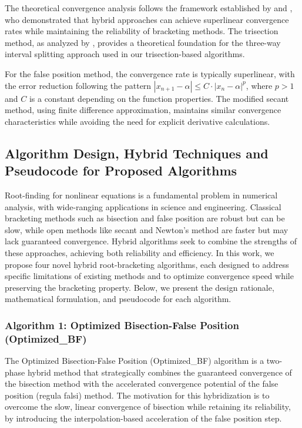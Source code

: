 \documentclass[amsmath, amssymb, aps]{revtex4-2}
\begin{document}
The theoretical convergence analysis follows the framework established by \cite{sabharwal2019blended} and \cite{badr2022novel}, who demonstrated that hybrid approaches can achieve superlinear convergence rates while maintaining the reliability of bracketing methods. The trisection method, as analyzed by \cite{demir2008trisection}, provides a theoretical foundation for the three-way interval splitting approach used in our trisection-based algorithms.

For the false position method, the convergence rate is typically superlinear, with the error reduction following the pattern $|x_{n+1} - \alpha| \leq C \cdot |x_n - \alpha|^p$, where $p > 1$ and $C$ is a constant depending on the function properties. The modified secant method, using finite difference approximation, maintains similar convergence characteristics while avoiding the need for explicit derivative calculations.

\subsection{Algorithm Design, Hybrid Techniques and Pseudocode for Proposed Algorithms}

\vspace{-1.2ex} %

Root-finding for nonlinear equations is a fundamental problem in numerical analysis, with wide-ranging applications in science and engineering. Classical bracketing methods such as bisection and false position are robust but can be slow, while open methods like secant and Newton's method are faster but may lack guaranteed convergence. Hybrid algorithms seek to combine the strengths of these approaches, achieving both reliability and efficiency. In this work, we propose four novel hybrid root-bracketing algorithms, each designed to address specific limitations of existing methods and to optimize convergence speed while preserving the bracketing property. Below, we present the design rationale, mathematical formulation, and pseudocode for each algorithm.


\subsubsection{Algorithm 1: Optimized Bisection-False Position (Optimized\_BF)}
\vspace{-0.8ex} %
The Optimized Bisection-False Position (Optimized\_BF) algorithm is a two-phase hybrid method that strategically combines the guaranteed convergence of the bisection method with the accelerated convergence potential of the false position (regula falsi) method. The motivation for this hybridization is to overcome the slow, linear convergence of bisection while retaining its reliability, by introducing the interpolation-based acceleration of the false position step.
\end{document}

